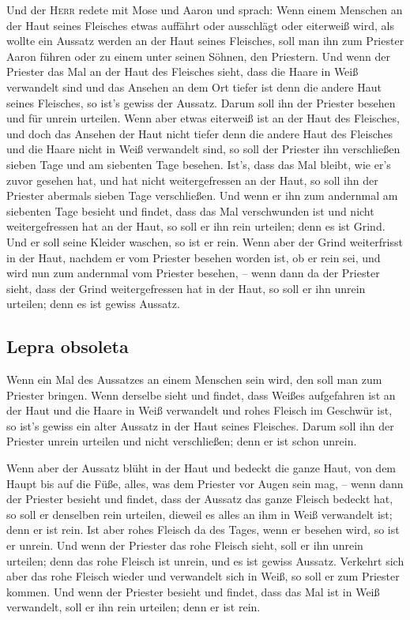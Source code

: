  Und der \textsc{Herr} redete mit Mose und Aaron und
sprach:  Wenn einem Menschen an der Haut seines Fleisches
etwas auffährt oder ausschlägt oder eiterweiß wird, als wollte ein
Aussatz werden an der Haut seines Fleisches, soll man ihn zum Priester
Aaron führen oder zu einem unter seinen Söhnen, den Priestern.
 Und wenn der Priester das Mal an der Haut des Fleisches
sieht, dass die Haare in Weiß verwandelt sind und das Ansehen an dem Ort
tiefer ist denn die andere Haut seines Fleisches, so ist's gewiss der
Aussatz. Darum soll ihn der Priester besehen und für unrein urteilen.
 Wenn aber etwas eiterweiß ist an der Haut des Fleisches,
und doch das Ansehen der Haut nicht tiefer denn die andere Haut des
Fleisches und die Haare nicht in Weiß verwandelt sind, so soll der
Priester ihn verschließen sieben Tage  und am siebenten
Tage besehen. Ist's, dass das Mal bleibt, wie er's zuvor gesehen hat,
und hat nicht weitergefressen an der Haut,  so soll ihn
der Priester abermals sieben Tage verschließen. Und wenn er ihn zum
andernmal am siebenten Tage besieht und findet, dass das Mal
verschwunden ist und nicht weitergefressen hat an der Haut, so soll er
ihn rein urteilen; denn es ist Grind. Und er soll seine Kleider waschen,
so ist er rein.  Wenn aber der Grind weiterfrisst in der
Haut, nachdem er vom Priester besehen worden ist, ob er rein sei, und
wird nun zum andernmal vom Priester besehen, --  wenn dann
da der Priester sieht, dass der Grind weitergefressen hat in der Haut,
so soll er ihn unrein urteilen; denn es ist gewiss Aussatz.

\hypertarget{lepra-obsoleta}{%
\subsection{Lepra obsoleta}\label{lepra-obsoleta}}

 Wenn ein Mal des Aussatzes an einem Menschen sein wird,
den soll man zum Priester bringen.  Wenn derselbe sieht
und findet, dass Weißes aufgefahren ist an der Haut und die Haare in
Weiß verwandelt und rohes Fleisch im Geschwür ist,  so
ist's gewiss ein alter Aussatz in der Haut seines Fleisches. Darum soll
ihn der Priester unrein urteilen und nicht verschließen; denn er ist
schon unrein.

 Wenn aber der Aussatz blüht in der Haut und bedeckt die
ganze Haut, von dem Haupt bis auf die Füße, alles, was dem Priester vor
Augen sein mag, --  wenn dann der Priester besieht und
findet, dass der Aussatz das ganze Fleisch bedeckt hat, so soll er
denselben rein urteilen, dieweil es alles an ihm in Weiß verwandelt ist;
denn er ist rein.  Ist aber rohes Fleisch da des Tages,
wenn er besehen wird, so ist er unrein.  Und wenn der
Priester das rohe Fleisch sieht, soll er ihn unrein urteilen; denn das
rohe Fleisch ist unrein, und es ist gewiss Aussatz. 
Verkehrt sich aber das rohe Fleisch wieder und verwandelt sich in Weiß,
so soll er zum Priester kommen.  Und wenn der Priester
besieht und findet, dass das Mal ist in Weiß verwandelt, soll er ihn
rein urteilen; denn er ist rein.

